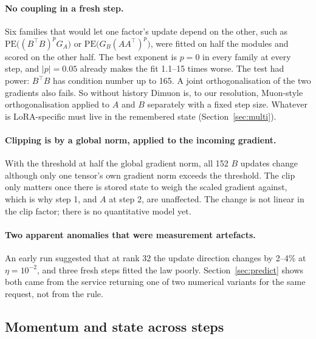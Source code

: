 \documentclass[11pt]{article}
\begin{document}
\paragraph{No coupling in a fresh step.} Six families that would let one factor's update depend
on the other, such as $\mathrm{PE}\big((B^\top B)^pG_A\big)$ or
$\mathrm{PE}\big(G_B(AA^\top)^p\big)$, were fitted on half the modules and scored on the other
half. The best exponent is $p=0$ in every family at every step, and $|p|=0.05$ already makes
the fit 1.1--15 times worse. The test had power: $B^\top B$ has condition number up to 165.
A joint orthogonalisation of the two gradients also fails. So without history Dimuon is, to our
resolution, Muon-style orthogonalisation applied to $A$ and $B$ separately with a fixed step
size. Whatever is LoRA-specific must live in the remembered state
(Section~\ref{sec:multi}).

\paragraph{Clipping is by a global norm, applied to the incoming gradient.} With the threshold
at half the global gradient norm, all 152 $B$ updates change although only one tensor's own
gradient norm exceeds the threshold. The clip only matters once there is stored state to weigh
the scaled gradient against, which is why step 1, and $A$ at step 2, are unaffected. The change
is not linear in the clip factor; there is no quantitative model yet.

\paragraph{Two apparent anomalies that were measurement artefacts.} An early run suggested
that at rank 32 the update direction changes by 2--4\% at $\eta=10^{-2}$, and three fresh steps
fitted the law poorly. Section~\ref{sec:predict} shows both came from the service returning one
of two numerical variants for the same request, not from the rule.

\subsection{Momentum and state across steps}\label{sec:rule}
\end{document}
